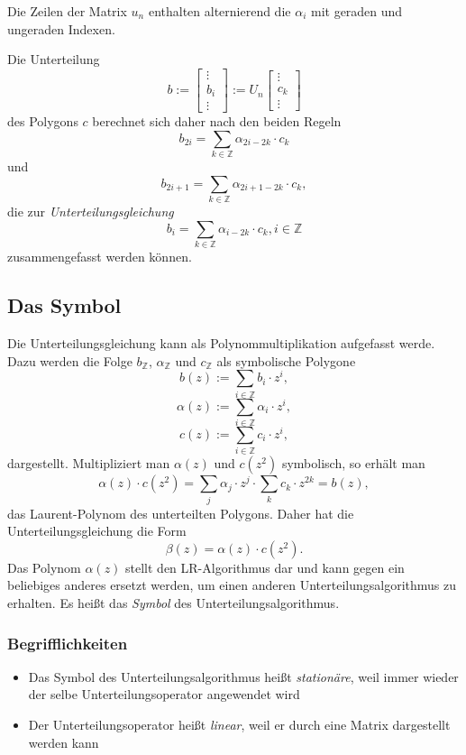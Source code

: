 Die Zeilen der Matrix \(u_n\) enthalten alternierend die \(\alpha_i\) mit geraden und ungeraden Indexen.

Die Unterteilung
\[b:= \begin{bmatrix} \vdots \\ b_i \\ \vdots \end{bmatrix} := U_n \begin{bmatrix} \vdots \\ c_k \\ \vdots \end{bmatrix}\]
des Polygons \(c\) berechnet sich daher nach den beiden Regeln
\[b_{2i} = \sum_{k\in \mathbb{Z}} \alpha_{2i-2k}\cdot c_k\]
und
\[b_{2i+1} = \sum_{k\in \mathbb{Z}} \alpha_{2i+1-2k}\cdot c_k,\]
die zur \textit{Unterteilungsgleichung}
\[b_i = \sum_{k\in \mathbb{Z}} \alpha_{i-2k}\cdot c_k, i \in \mathbb{Z}\]
zusammengefasst werden können.


\subsection{Das Symbol}
Die Unterteilungsgleichung kann als Polynommultiplikation aufgefasst werde. Dazu werden die Folge \(b_{\mathbb{Z}}\), \(\alpha_{\mathbb{Z}}\) und \(c_{\mathbb{Z}}\) als symbolische Polygone
\[b(z) := \sum_{i \in \mathbb{Z}} b_i \cdot z^i,\]
\[\alpha(z) := \sum_{i \in \mathbb{Z}} \alpha_i \cdot z^i,\]
\[c(z) := \sum_{i \in \mathbb{Z}} c_i \cdot z^i,\]
dargestellt. Multipliziert man \(\alpha(z)\) und \(c(z^2)\) symbolisch, so erhält man
\[\alpha(z) \cdot c(z^2) = \sum_j \alpha_j\cdot z^j \cdot \sum_k c_k\cdot z^{2k} = b(z),\]
das Laurent-Polynom des unterteilten Polygons. Daher hat die Unterteilungsgleichung die Form
\[\beta(z) = \alpha(z)\cdot c(z^2).\]
Das Polynom \(\alpha(z)\) stellt den LR-Algorithmus dar und kann gegen ein beliebiges anderes ersetzt werden, um einen anderen Unterteilungsalgorithmus zu erhalten. Es heißt das \textit{Symbol} des Unterteilungsalgorithmus.

\subsubsection{Begrifflichkeiten}
\begin{itemize}
	\item Das Symbol des Unterteilungsalgorithmus heißt \textit{stationäre}, weil immer wieder der selbe Unterteilungsoperator angewendet wird
	\item Der Unterteilungsoperator heißt \textit{linear}, weil er durch eine Matrix dargestellt werden kann
\end{itemize}

